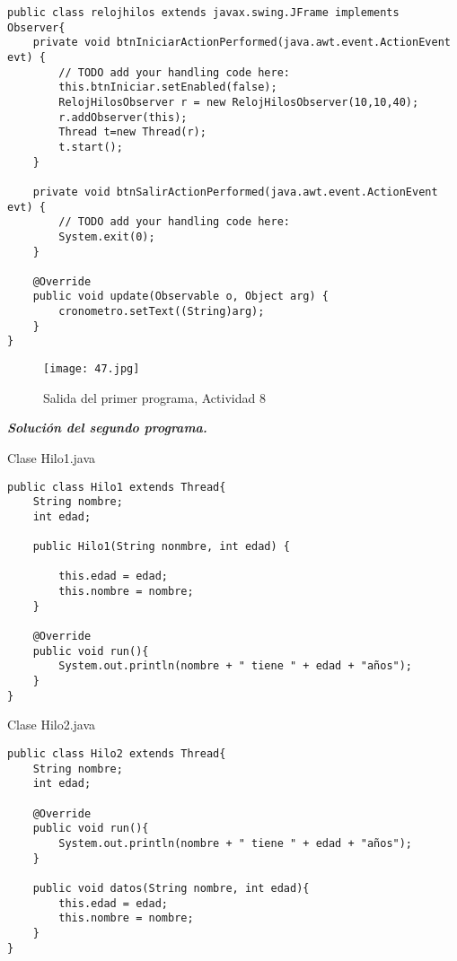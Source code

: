 \begin{verbatim}
public class relojhilos extends javax.swing.JFrame implements Observer{
    private void btnIniciarActionPerformed(java.awt.event.ActionEvent evt) {                                           
        // TODO add your handling code here:
        this.btnIniciar.setEnabled(false);
        RelojHilosObserver r = new RelojHilosObserver(10,10,40);
        r.addObserver(this);
        Thread t=new Thread(r);
        t.start();
    }                                          

    private void btnSalirActionPerformed(java.awt.event.ActionEvent evt) {                                         
        // TODO add your handling code here:
        System.exit(0);
    } 
		
    @Override
    public void update(Observable o, Object arg) {
        cronometro.setText((String)arg);
    }
}
\end{verbatim} \vspace{1cm}
\begin{figure}[h!]
		\centering
		{\texttt{[image: 47.jpg]}\par} 
		\caption{Salida del primer programa, Actividad 8}\vspace{1cm}
\end{figure}

\textbf{\textit{Solución del segundo programa.}}

\begin{center}
Clase Hilo1.java
\end{center}

\begin{verbatim}
public class Hilo1 extends Thread{
    String nombre;
    int edad;

    public Hilo1(String nonmbre, int edad) {
        
        this.edad = edad;
        this.nombre = nombre;
    }
    
    @Override
    public void run(){
        System.out.println(nombre + " tiene " + edad + "años");
    }
}
\end{verbatim} \vspace{1cm}

\begin{center}
Clase Hilo2.java
\end{center}

\begin{verbatim}
public class Hilo2 extends Thread{
    String nombre;
    int edad;
    
    @Override
    public void run(){
        System.out.println(nombre + " tiene " + edad + "años");
    }
    
    public void datos(String nombre, int edad){
        this.edad = edad;
        this.nombre = nombre;
    } 
}
\end{verbatim} \vspace{1cm}

